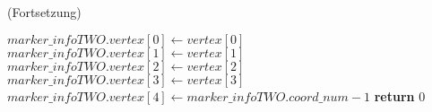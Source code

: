\begin{algorithm}[!ht]\small
\caption{ (Fortsetzung)}
\label{alg:checksquare-7}
\begin{algorithmic}[1]
	\State $\mathit{marker\_infoTWO.vertex}[0] \gets \mathit{vertex}[0]$
	\label{alg:checksquare-7-savesxsy}
	\State $\mathit{marker\_infoTWO.vertex}[1] \gets \mathit{vertex}[1]$
	\label{alg:checksquare-7-save1}
	\State $\mathit{marker\_infoTWO.vertex}[2] \gets \mathit{vertex}[2]$
	\State $\mathit{marker\_infoTWO.vertex}[3] \gets \mathit{vertex}[3]$
	\label{alg:checksquare-7-save3}
	\State $\mathit{marker\_infoTWO.vertex}[4] \gets \mathit{marker\_infoTWO.coord\_num} - 1$
	\label{alg:checksquare-7-savelast}
	\State \textbf{return} $0$
\end{algorithmic}
\end{algorithm}
